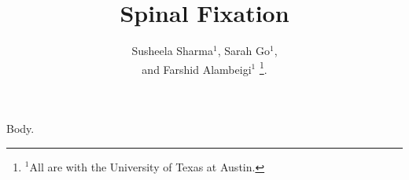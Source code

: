 \documentclass[conference]{ieeeconf}
\begin{document}
\title{Spinal Fixation}
\author{Susheela Sharma$^{1}$, Sarah Go$^{1}$,\\ and Farshid Alambeigi$^{1}$ 
\thanks{$^{1}$All are with the University of Texas at Austin.}.}
\maketitle
Body.
\end{document}
